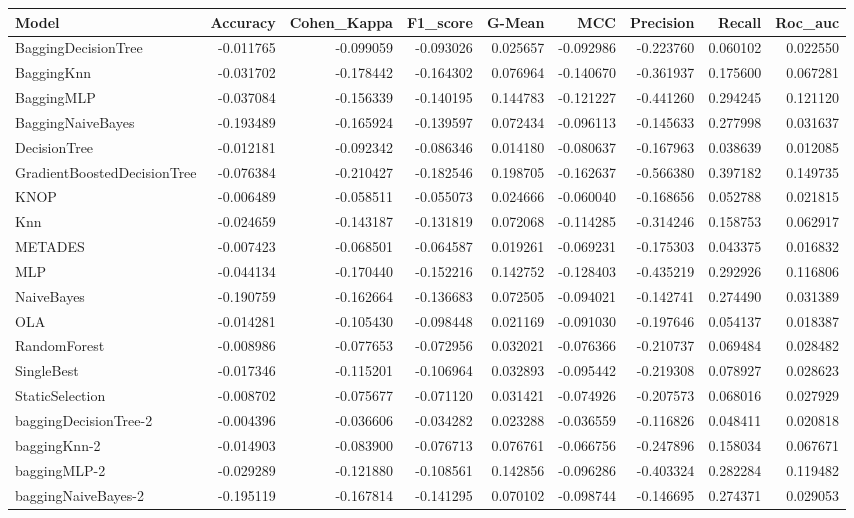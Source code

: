 \begin{tabular}{lrrrrrrrr}
\toprule
Model & Accuracy & Cohen_Kappa & F1_score & G-Mean & MCC & Precision & Recall & Roc_auc \\
\midrule
BaggingDecisionTree & -0.011765 & -0.099059 & -0.093026 & 0.025657 & -0.092986 & -0.223760 & 0.060102 & 0.022550 \\
BaggingKnn & -0.031702 & -0.178442 & -0.164302 & 0.076964 & -0.140670 & -0.361937 & 0.175600 & 0.067281 \\
BaggingMLP & -0.037084 & -0.156339 & -0.140195 & 0.144783 & -0.121227 & -0.441260 & 0.294245 & 0.121120 \\
BaggingNaiveBayes & -0.193489 & -0.165924 & -0.139597 & 0.072434 & -0.096113 & -0.145633 & 0.277998 & 0.031637 \\
DecisionTree & -0.012181 & -0.092342 & -0.086346 & 0.014180 & -0.080637 & -0.167963 & 0.038639 & 0.012085 \\
GradientBoostedDecisionTree & -0.076384 & -0.210427 & -0.182546 & 0.198705 & -0.162637 & -0.566380 & 0.397182 & 0.149735 \\
KNOP & -0.006489 & -0.058511 & -0.055073 & 0.024666 & -0.060040 & -0.168656 & 0.052788 & 0.021815 \\
Knn & -0.024659 & -0.143187 & -0.131819 & 0.072068 & -0.114285 & -0.314246 & 0.158753 & 0.062917 \\
METADES & -0.007423 & -0.068501 & -0.064587 & 0.019261 & -0.069231 & -0.175303 & 0.043375 & 0.016832 \\
MLP & -0.044134 & -0.170440 & -0.152216 & 0.142752 & -0.128403 & -0.435219 & 0.292926 & 0.116806 \\
NaiveBayes & -0.190759 & -0.162664 & -0.136683 & 0.072505 & -0.094021 & -0.142741 & 0.274490 & 0.031389 \\
OLA & -0.014281 & -0.105430 & -0.098448 & 0.021169 & -0.091030 & -0.197646 & 0.054137 & 0.018387 \\
RandomForest & -0.008986 & -0.077653 & -0.072956 & 0.032021 & -0.076366 & -0.210737 & 0.069484 & 0.028482 \\
SingleBest & -0.017346 & -0.115201 & -0.106964 & 0.032893 & -0.095442 & -0.219308 & 0.078927 & 0.028623 \\
StaticSelection & -0.008702 & -0.075677 & -0.071120 & 0.031421 & -0.074926 & -0.207573 & 0.068016 & 0.027929 \\
baggingDecisionTree-2 & -0.004396 & -0.036606 & -0.034282 & 0.023288 & -0.036559 & -0.116826 & 0.048411 & 0.020818 \\
baggingKnn-2 & -0.014903 & -0.083900 & -0.076713 & 0.076761 & -0.066756 & -0.247896 & 0.158034 & 0.067671 \\
baggingMLP-2 & -0.029289 & -0.121880 & -0.108561 & 0.142856 & -0.096286 & -0.403324 & 0.282284 & 0.119482 \\
baggingNaiveBayes-2 & -0.195119 & -0.167814 & -0.141295 & 0.070102 & -0.098744 & -0.146695 & 0.274371 & 0.029053 \\
\bottomrule
\end{tabular}
